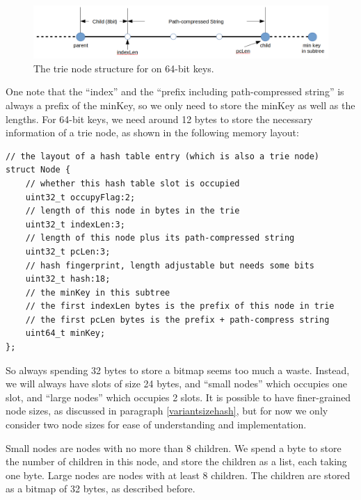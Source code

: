 \documentclass[11pt, usletter]{article}
\begin{document}
\begin{figure}[!htb]
  \includegraphics[width=\linewidth]{mlpindex64_node.png}
\caption{The trie node structure for \MlpIndex on 64-bit keys.}
\label{mlpindex64_node}
\end{figure}

One note that the ``index'' and the ``prefix including path-compressed string'' is always a prefix of the minKey, 
so we only need to store the minKey as well as the lengths. 
For 64-bit keys, we need around 12 bytes to store the necessary information of a trie node, 
as shown in the following memory layout:

\singlespacing\begin{codebox}
\begin{verbatim}
// the layout of a hash table entry (which is also a trie node)
struct Node {
    // whether this hash table slot is occupied
    uint32_t occupyFlag:2; 
    // length of this node in bytes in the trie
    uint32_t indexLen:3;
    // length of this node plus its path-compressed string
    uint32_t pcLen:3;
    // hash fingerprint, length adjustable but needs some bits
    uint32_t hash:18;
    // the minKey in this subtree
    // the first indexLen bytes is the prefix of this node in trie
    // the first pcLen bytes is the prefix + path-compress string
    uint64_t minKey;
};  
\end{verbatim}
\end{codebox}\doublespacing

So always spending 32 bytes to store a bitmap seems too much a waste. 
Instead, we will always have slots of size 24 bytes, 
and ``small nodes'' which occupies one slot, and ``large nodes'' which occupies 2 slots. 
It is possible to have finer-grained node sizes, as discussed in paragraph \ref{variantsizehash}, 
but for now we only consider two node sizes for ease of understanding and implementation.

Small nodes are nodes with no more than 8 children.
We spend a byte to store the number of children in this node, 
and store the children as a list, each taking one byte. 
Large nodes are nodes with at least 8 children. 
The children are stored as a bitmap of 32 bytes, as described before.
\end{document}
